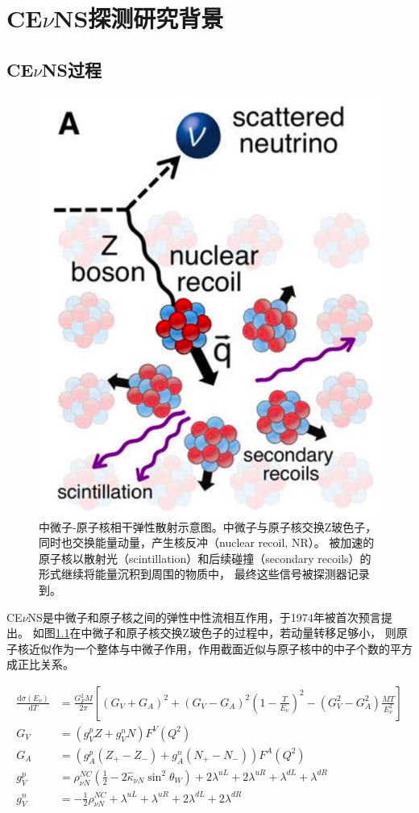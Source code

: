 
\chapter{CE$\nu$NS探测研究背景}

\section{CE$\nu$NS过程}

\begin{figure}
    \centering
    \includegraphics[width=0.4\linewidth]{figures/CEvNS_demo.png}
    \caption{\label{fig:cevns_demo} 中微子-原子核相干弹性散射示意图。中微子与原子核交换Z玻色子，同时也交换能量动量，产生核反冲（nuclear recoil, NR）。
    被加速的原子核以散射光（scintillation）和后续碰撞（secondary recoils）的形式继续将能量沉积到周围的物质中，
    最终这些信号被探测器记录到\cite{akimov_observation_2017}。}
\end{figure}

CE$\nu$NS是中微子和原子核之间的弹性中性流相互作用，于1974年被首次预言提出\cite{freedman_coherent_1974,kopeliovich_isotopic_1974}。
如图\ref{fig:cevns_demo}在中微子和原子核交换Z玻色子的过程中，若动量转移足够小，
则原子核近似作为一个整体与中微子作用，作用截面近似与原子核中的中子个数的平方成正比关系。

\begin{align}
    \label{eq:cevns}
    \frac{\mathrm{d}\sigma(E_\nu)}{\mathrm{d}T} &= \frac{G_F^2 M}{2\pi}\left[(G_V+G_A)^2+(G_V-G_A)^2(1-\frac{T}{E_{\nu}})^2-(G_V^2-G_A^2)\frac{MT}{E_{\nu}^2}\right] \\
    G_V &= (g_V^p Z+g_V^n N)F^V(Q^2) \\
    G_A &= (g_A^p(Z_{+}-Z_{-})+g_A^n(N_{+}-N_{-}))F^A(Q^2) \\
    \label{eq:cevns_theta}
    g_V^p &= \rho_{\nu N}^{NC}(\frac{1}{2} - 2\hat{\kappa}_{\nu N}\sin^2\theta_W) + 2\lambda^{uL} + 2\lambda^{uR} + \lambda^{dL} + \lambda^{dR} \\
    g_V^n &= -\frac{1}{2}\rho_{\nu N}^{NC} + \lambda^{uL} + \lambda^{uR} + 2\lambda^{dL} + 2\lambda^{dR}
\end{align}

